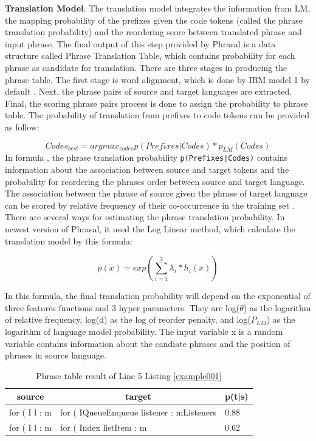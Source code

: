 \textbf{Translation Model}. The translation model integrates the information from LM, the mapping probability of the prefixes given the code tokens (called the phrase translation probability) and the reordering score between translated phrase and input phrase. The final output of this step provided by Phrasal is a data structure called Phrase Translation Table, which contains probability for each phrase as candidate for translation. There are three stages in producing the phrase table. The first stage is word alignment, which is done by IBM model 1 by default \cite{039}. Next, the phrase pairs of source and target languages are extracted. Final, the scoring phrase pairs process is done to assign the probability to phrase table. The probability of translation from prefixes to code tokens can be provided as follow:

\begin{equation} 
\label{eq:003}
Codes_{best}=argmax_{codes}p(Prefixes|Codes) * p_{LM}(Codes)
\end{equation}
In formula \cite{039}, the phrase translation probability \texttt{p(Prefixes|Codes)} contains information about the association between source and target tokens and the probability for reordering the phrases order between source and target language. The association between the phrase of source given the phrase of target language can be scored by relative frequency of their co-occurrence in the training set \cite{039}. There are several ways for estimating the phrase translation probability. In newest version of Phrasal, it used the Log Linear method, which calculate the translation model by this formula:

\begin{equation} 
\label{eq:003}
p(x)=exp (\sum_{i=1}^{3}\lambda _{i}*h_{i}(x))
\end{equation}

In this formula, the final translation probability will depend on the exponential of three features functions and 3 hyper parameters. They are log($\theta$) as the logarithm of  relative frequency, log(d) as the log of reorder penalty, and log($P_{LM}$) as the logarithm of language model probability. The input variable x is a random variable contains information about the candiate phrases and the position of phrases in source language.

\begin{table}[]
\begin{tabular}{|l|l|l|}
\hline
\multicolumn{1}{|c|}{\textbf{source}} & \multicolumn{1}{c|}{\textbf{target}}      & \multicolumn{1}{c|}{\textbf{p(t|s)}} \\ \hline
for ( I l : m                         & for ( IQueueEnqueue listener : mListeners & 0.88                                 \\ \hline
for ( I l : m                         & for ( Index listItem : m                  & 0.62                                 \\ \hline
\end{tabular}
\caption{Phrase table result of Line 5 Listing \ref{example001} }
\label{tbl002}
\end{table}

